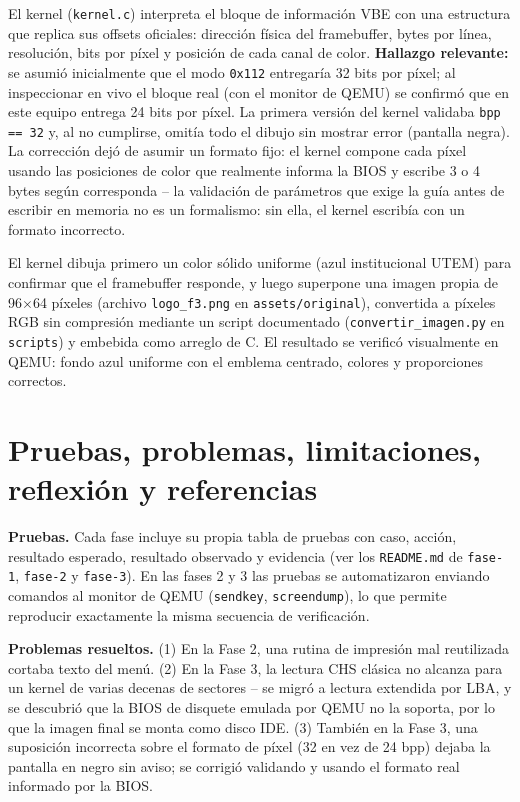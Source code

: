 \documentclass[11pt,a4paper]{article}
\begin{document}
El kernel (\texttt{kernel.c}) interpreta el bloque de información VBE con una estructura que
replica sus offsets oficiales: dirección física del framebuffer, bytes por línea, resolución,
bits por píxel y posición de cada canal de color. \textbf{Hallazgo relevante:} se asumió
inicialmente que el modo \texttt{0x112} entregaría 32 bits por píxel; al inspeccionar en vivo
el bloque real (con el monitor de QEMU) se confirmó que en este equipo entrega 24 bits por
píxel. La primera versión del kernel validaba \texttt{bpp == 32} y, al no cumplirse, omitía
todo el dibujo sin mostrar error (pantalla negra). La corrección dejó de asumir un formato
fijo: el kernel compone cada píxel usando las posiciones de color que realmente informa la
BIOS y escribe 3 o 4 bytes según corresponda -- la validación de parámetros que exige la guía
antes de escribir en memoria no es un formalismo: sin ella, el kernel escribía con un formato
incorrecto.

El kernel dibuja primero un color sólido uniforme (azul institucional UTEM) para confirmar que
el framebuffer responde, y luego superpone una imagen propia de 96$\times$64 píxeles (archivo
\texttt{logo\_f3.png} en \texttt{assets/original}), convertida a píxeles RGB sin compresión
mediante un script documentado (\texttt{convertir\_imagen.py} en \texttt{scripts}) y embebida
como arreglo de C. El
resultado se verificó visualmente en QEMU: fondo azul uniforme con el emblema centrado,
colores y proporciones correctos.

\section{Pruebas, problemas, limitaciones, reflexión y referencias}

\textbf{Pruebas.} Cada fase incluye su propia tabla de pruebas con caso, acción, resultado
esperado, resultado observado y evidencia (ver los \texttt{README.md} de \texttt{fase-1},
\texttt{fase-2} y \texttt{fase-3}). En las fases 2 y 3 las pruebas se automatizaron enviando
comandos al monitor de QEMU (\texttt{sendkey}, \texttt{screendump}), lo que permite reproducir
exactamente la misma secuencia de verificación.

\textbf{Problemas resueltos.} (1) En la Fase 2, una rutina de impresión mal reutilizada cortaba
texto del menú. (2) En la Fase 3, la lectura CHS clásica no alcanza para un kernel de varias
decenas de sectores -- se migró a lectura extendida por LBA, y se descubrió que la BIOS de
disquete emulada por QEMU no la soporta, por lo que la imagen final se monta como disco IDE.
(3) También en la Fase 3, una suposición incorrecta sobre el formato de píxel (32 en vez de 24
bpp) dejaba la pantalla en negro sin aviso; se corrigió validando y usando el formato real
informado por la BIOS.
\end{document}
